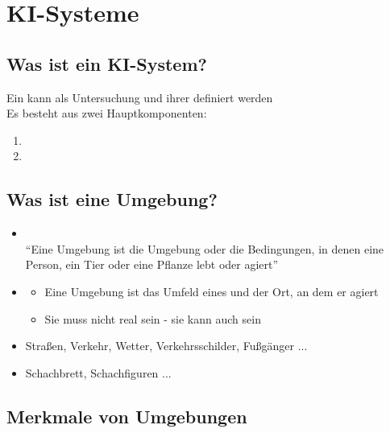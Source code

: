 \section{KI-Systeme}
\subsection{Was ist ein KI-System?}
Ein  kann als Untersuchung  und ihrer  definiert werden\\
Es besteht aus zwei Hauptkomponenten:
\begin{enumerate}
    \item {}
    \item {}
\end{enumerate}
\subsection{Was ist eine Umgebung?}
\begin{itemize}
    \item {}\\
    \enquote{Eine Umgebung ist die Umgebung oder die Bedingungen, in denen eine Person, ein Tier oder eine Pflanze lebt oder agiert}
    \item {}
    \begin{itemize}
        \item Eine Umgebung ist das Umfeld eines  und der Ort, an dem er agiert
        \item Sie muss nicht real sein - sie kann auch  sein
    \end{itemize}
\end{itemize}
\begin{itemize}
    \item {} Straßen, Verkehr, Wetter, Verkehrsschilder, Fußgänger ...
    \item {} Schachbrett, Schachfiguren ...
\end{itemize}
\subsection{Merkmale von Umgebungen}

